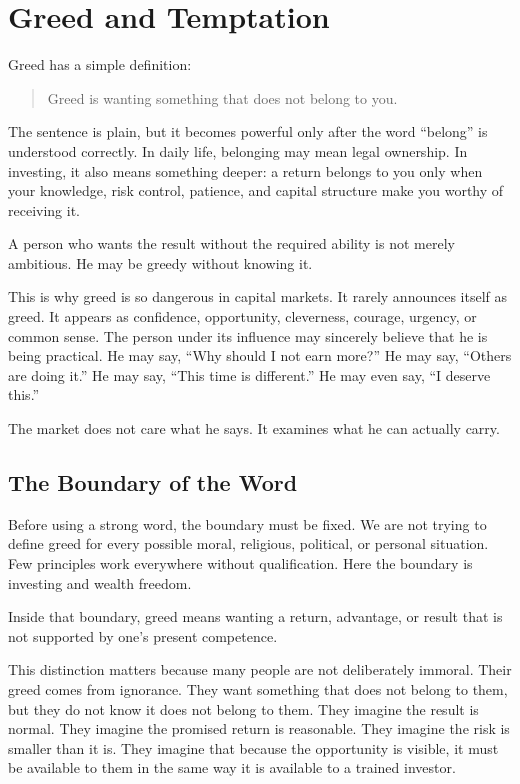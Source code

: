 \chapter{Greed and Temptation}

Greed has a simple definition:

\begin{quote}
Greed is wanting something that does not belong to you.
\end{quote}

The sentence is plain, but it becomes powerful only after the word ``belong'' is understood correctly. In daily life, belonging may mean legal ownership. In investing, it also means something deeper: a return belongs to you only when your knowledge, risk control, patience, and capital structure make you worthy of receiving it.

A person who wants the result without the required ability is not merely ambitious. He may be greedy without knowing it.

This is why greed is so dangerous in capital markets. It rarely announces itself as greed. It appears as confidence, opportunity, cleverness, courage, urgency, or common sense. The person under its influence may sincerely believe that he is being practical. He may say, ``Why should I not earn more?'' He may say, ``Others are doing it.'' He may say, ``This time is different.'' He may even say, ``I deserve this.''

The market does not care what he says. It examines what he can actually carry.

\section*{The Boundary of the Word}

Before using a strong word, the boundary must be fixed. We are not trying to define greed for every possible moral, religious, political, or personal situation. Few principles work everywhere without qualification. Here the boundary is investing and wealth freedom.

Inside that boundary, greed means wanting a return, advantage, or result that is not supported by one's present competence.

This distinction matters because many people are not deliberately immoral. Their greed comes from ignorance. They want something that does not belong to them, but they do not know it does not belong to them. They imagine the result is normal. They imagine the promised return is reasonable. They imagine the risk is smaller than it is. They imagine that because the opportunity is visible, it must be available to them in the same way it is available to a trained investor.

